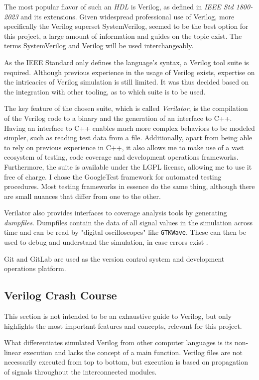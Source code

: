 The most popular flavor of such an \textit{HDL} is Verilog, as defined in \textit{IEEE Std 1800-2023} \cite{10458102} and its extensions. Given widespread professional use of Verilog, more specifically the Verilog superset SystemVerilog, seemed to be the best option for this project, a large amount of information and guides on the topic exist. The terms SystemVerilog and Verilog will be used interchangeably. 

As the IEEE Standard only defines the language's syntax, a Verilog tool suite is required. Although previous experience in the usage of Verilog exists, expertise on the intricacies of Verilog simulation is still limited. It was thus decided based on the integration with other tooling, as to which suite is to be used. 

The key feature of the chosen suite, which is called \textit{Verilator}, is the compilation of the Verilog code to a binary and the generation of an interface to C++. Having an interface to C++ enables much more complex behaviors to be modeled simpler, such as reading test data from a file. Additionally, apart from being able to rely on previous experience in C++, it also allows me to make use of a vast ecosystem of testing, code coverage and development operations frameworks. Furthermore, the suite is available under the LGPL license, allowing me to use it free of charge. I chose the GoogleTest framework for automated testing procedures. Most testing frameworks in essence do the same thing, although there are small nuances that differ from one to the other. 

Verilator also provides interfaces to coverage analysis tools by generating \textit{dumpfiles}. Dumpfiles contain the data of all signal values in the simulation across time and can be read by "digital oscilloscopes" like \texttt{GTKWave}. These can then be used to debug and understand the simulation, in case errors exist \cite{verilatoroverview}.

Git and GitLab are used as the version control system and development operations platform.

\subsection{Verilog Crash Course}
This section is not intended to be an exhaustive guide to Verilog, but only highlights the most important features and concepts, relevant for this project.

What differentiates simulated Verilog from other computer languages is its non-linear execution and lacks the concept of a main function. Verilog files are not necessarily executed from top to bottom, but execution is based on propagation of signals throughout the interconnected modules. 

